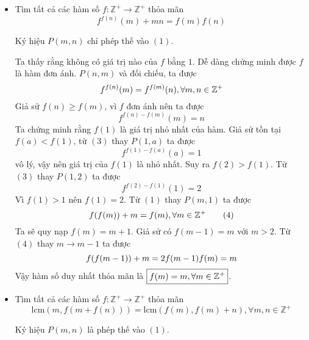 \documentclass[11pt]{scrartcl}
\begin{document}
\begin{itemize}[label=, leftmargin=0em, itemsep=0.5em]
    \item \begin{bt}
        Tìm tất cả các hàm số $f: \mathbb{Z}^+\rightarrow \mathbb{Z}^+$ thỏa mãn
        \[f^{f(n)}(m)+mn=f(m)f(n)\tag{1}\]
    \end{bt}
    \begin{sol}
        Ký hiệu $P(m,n)$ chỉ phép thế vào $(1)$. 

        Ta thấy rằng không có giá trị nào của $f$ bằng $1$. Dễ dàng chứng minh được $f$ là hàm đơn ánh. $P(n,m)$ và đối chiếu, ta được 
        \[
            f^{f(n)}(m) = f^{f(m)}(n) , \forall m,n \in \mathbb{Z^+}
        \]
        Giả sử $f(n) \geq f(m)$, vì $f$ đơn ánh nên ta được 
        \[
            f^{f(n) -f(m)}(m) = n\tag{3}
        \]
        Ta chứng minh rằng $f(1)$ là giá trị nhỏ nhất của hàm. Giả sử tồn tại $f(a) < f(1)$, từ $(3)$ thay $P(1,a)$ ta được 
        \[
            f^{f(1) - f(a)}(a) = 1
        \]
        vô lý, vậy nên giá trị của $f(1)$ là nhỏ nhất. Suy ra $f(2) > f(1)$. Từ $(3)$ thay $P(1,2)$ ta được 
        \[
            f^{f(2) - f(1)}(1) = 2
        \]
        Vì $f(1) > 1$  nên $f(1) = 2$. Từ $(1)$ thay $P(m,1)$ ta được
        \[
            f(f(m)) + m = f(m), \forall m \in \mathbb{Z^+} \tag{4}
        \]
        Ta sẽ quy nạp $f(m) = m + 1$. Giả sử có $f(m - 1) = m$ với $m > 2$.  Từ $(4)$ thay $m \to m - 1$ ta được
        \[
            f(f(m - 1)) + m = 2f(m - 1) \lra f(m) = m
        \]
        Vậy hàm số duy nhất thỏa mãn là $\boxed{f(m) = m, \forall m \in \mathbb{Z^+}}$.
    \end{sol} 
    \begin{comment}
    \item \begin{btvn}\vocab{(Hà Tĩnh TST 2023).}
        Tìm tất cả các hàm số $f: \bb{R} \to \bb{R}$ thỏa mãn 
        \[
            f(xf(x + y)) = f(yf(x)) + x^2
        \]
        với mọi số thực $x,y$.
    \end{btvn}
    \end{comment}
    \item \begin{bt}
        Tìm tất cả các hàm số $f: \mathbb{Z}^+\rightarrow \mathbb{Z}^+$ thỏa mãn
        \[
        \text{lcm}(m, f(m+f(n)))=\text{lcm}(f(m), f(m)+n), \forall m,n \in \mathbb{Z}^+
        \tag{1}\]
    \end{bt}
    \begin{sol}
        Ký hiệu $P(m,n)$ là phép thế vào $(1)$.


\end{sol}
\end{itemize}
\end{document}

